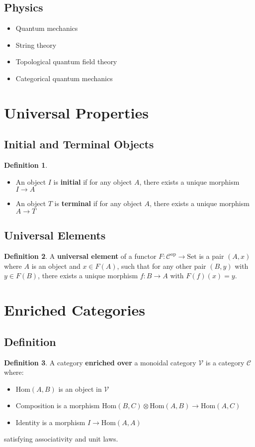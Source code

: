 \documentclass[11pt]{article}
\theoremstyle{definition}
\newtheorem{definition}{Definition}[section]
\begin{document}
\subsection{Physics}
\begin{itemize}
    \item Quantum mechanics
    \item String theory
    \item Topological quantum field theory
    \item Categorical quantum mechanics
\end{itemize}

\section{Universal Properties}

\subsection{Initial and Terminal Objects}
\begin{definition}
\begin{itemize}
    \item An object $I$ is \textbf{initial} if for any object $A$, there exists a unique morphism $I \to A$
    \item An object $T$ is \textbf{terminal} if for any object $A$, there exists a unique morphism $A \to T$
\end{itemize}
\end{definition}

\subsection{Universal Elements}
\begin{definition}
A \textbf{universal element} of a functor $F: \mathcal{C}^{\text{op}} \to \text{Set}$ is a pair $(A, x)$ where $A$ is an object and $x \in F(A)$, such that for any other pair $(B, y)$ with $y \in F(B)$, there exists a unique morphism $f: B \to A$ with $F(f)(x) = y$.
\end{definition}

\section{Enriched Categories}

\subsection{Definition}
\begin{definition}
A category \textbf{enriched over} a monoidal category $\mathcal{V}$ is a category $\mathcal{C}$ where:
\begin{itemize}
    \item $\text{Hom}(A,B)$ is an object in $\mathcal{V}$
    \item Composition is a morphism $\text{Hom}(B,C) \otimes \text{Hom}(A,B) \to \text{Hom}(A,C)$
    \item Identity is a morphism $I \to \text{Hom}(A,A)$
\end{itemize}
satisfying associativity and unit laws.
\end{definition}
\end{document}

